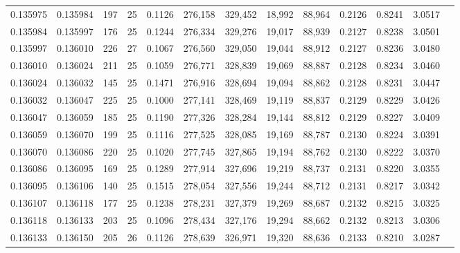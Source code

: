 \begin{tabular}{rrrrrrrrrrrrr}
0.135975 & 0.135984 &   197 &  25 &                                     0.1126 & 276,158 & 329,452 &  18,992 &  88,964 & 0.2126 & 0.8241 & 3.0517 \\
0.135984 & 0.135997 &   176 &  25 &                                     0.1244 & 276,334 & 329,276 &  19,017 &  88,939 & 0.2127 & 0.8238 & 3.0501 \\
0.135997 & 0.136010 &   226 &  27 &                                     0.1067 & 276,560 & 329,050 &  19,044 &  88,912 & 0.2127 & 0.8236 & 3.0480 \\
0.136010 & 0.136024 &   211 &  25 &                                     0.1059 & 276,771 & 328,839 &  19,069 &  88,887 & 0.2128 & 0.8234 & 3.0460 \\
0.136024 & 0.136032 &   145 &  25 &                                     0.1471 & 276,916 & 328,694 &  19,094 &  88,862 & 0.2128 & 0.8231 & 3.0447 \\
0.136032 & 0.136047 &   225 &  25 &                                     0.1000 & 277,141 & 328,469 &  19,119 &  88,837 & 0.2129 & 0.8229 & 3.0426 \\
0.136047 & 0.136059 &   185 &  25 &                                     0.1190 & 277,326 & 328,284 &  19,144 &  88,812 & 0.2129 & 0.8227 & 3.0409 \\
0.136059 & 0.136070 &   199 &  25 &                                     0.1116 & 277,525 & 328,085 &  19,169 &  88,787 & 0.2130 & 0.8224 & 3.0391 \\
0.136070 & 0.136086 &   220 &  25 &                                     0.1020 & 277,745 & 327,865 &  19,194 &  88,762 & 0.2130 & 0.8222 & 3.0370 \\
0.136086 & 0.136095 &   169 &  25 &                                     0.1289 & 277,914 & 327,696 &  19,219 &  88,737 & 0.2131 & 0.8220 & 3.0355 \\
0.136095 & 0.136106 &   140 &  25 &                                     0.1515 & 278,054 & 327,556 &  19,244 &  88,712 & 0.2131 & 0.8217 & 3.0342 \\
0.136107 & 0.136118 &   177 &  25 &                                     0.1238 & 278,231 & 327,379 &  19,269 &  88,687 & 0.2132 & 0.8215 & 3.0325 \\
0.136118 & 0.136133 &   203 &  25 &                                     0.1096 & 278,434 & 327,176 &  19,294 &  88,662 & 0.2132 & 0.8213 & 3.0306 \\
0.136133 & 0.136150 &   205 &  26 &                                     0.1126 & 278,639 & 326,971 &  19,320 &  88,636 & 0.2133 & 0.8210 & 3.0287 \\

\end{tabular}
